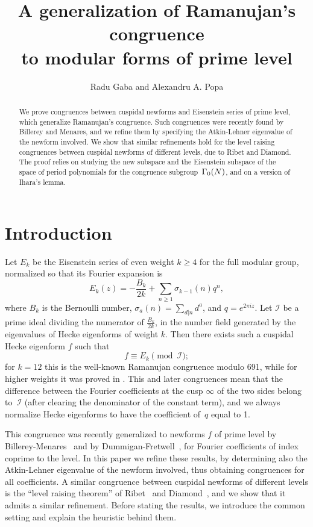\documentclass{amsart}
\title[A generalization of Ramanujan's congruence]
{A generalization of Ramanujan's congruence\\ to modular forms of prime level}
\author{Radu Gaba and Alexandru A. Popa}
\theoremstyle{plain}
\theoremstyle{definition}
\numberwithin{equation}{section}
\def\I{\mathcal{I}} \def\J{\mathcal{J}} \def\LL{\mathcal{L}}
\def\be{\begin{equation}}  \def\ee{\end{equation}}
\begin{document}
\begin{abstract} We prove congruences between cuspidal newforms and
Eisenstein series of prime level, which generalize Ramanujan's congruence. 
Such congruences were recently found by Billerey and Menares, 
and we refine them by specifying the Atkin-Lehner eigenvalue of the newform 
involved. We show that similar refinements hold for the level raising congruences 
between cuspidal newforms of different levels, due to Ribet and Diamond. 
The proof relies on studying the new subspace and the Eisenstein subspace 
of the space of period polynomials for the congruence subgroup~$\Gamma_0(N)$, 
and on a version of Ihara's lemma. 
\end{abstract}
\maketitle


\section{Introduction}

Let $E_k$ be the Eisenstein series of even weight $k\ge 4$ for the full
modular group, normalized so that its Fourier expansion is
 \[ E_k(z)=-\frac{B_k}{2k}+\sum_{n\ge 1} \sigma_{k-1}(n) q^n, \]
where  $B_k$ is the Bernoulli number, $\sigma_{a}(n)=\sum_{d|n} d^a$, 
and $q=e^{2\pi i z}$. Let $\I$ be a prime ideal dividing 
the numerator of $\frac{B_k}{2k}$, in the number field generated by 
the eigenvalues of Hecke eigenforms of weight $k$.  
Then there exists such a cuspidal Hecke eigenform $f$ such that 
 \be \label{e0} f\equiv E_k \pmod{\I};\ee
for $k=12$ this is the well-known Ramanujan congruence modulo 691, 
while for higher weights it was proved in \cite{H,DG}. This and later 
congruences mean that the difference between the 
Fourier coefficients at the cusp $\infty$ of the two sides belong to~$\I$
(after clearing the denominator of the constant term), and we always normalize
Hecke eigenforms to have the coefficient of~$q$ equal to 1. 

This congruence was recently generalized to newforms $f$ of prime level by 
Billerey-Menares~\cite{BM} and by Dummigan-Fretwell~\cite{DF}, for 
Fourier coefficients of index coprime to the level. In this paper 
we refine these results, by determining also the Atkin-Lehner eigenvalue 
of the newform involved, thus obtaining congruences for all coefficients.
A similar congruence between cuspidal newforms of different levels is the 
``level raising theorem'' of Ribet~\cite{Ri} and Diamond~\cite{Di}, and 
we show that it admits a similar refinement. Before stating the results, 
we introduce the common setting and explain the heuristic behind them. 
\end{document}
